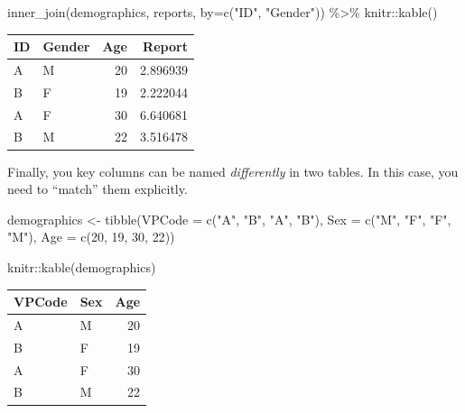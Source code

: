 \documentclass[
]{book}
\newenvironment{Shaded}{\begin{snugshade}}{\end{snugshade}}
\newcommand{\AttributeTok}[1]{\textcolor[rgb]{0.77,0.63,0.00}{#1}}
\newcommand{\DecValTok}[1]{\textcolor[rgb]{0.00,0.00,0.81}{#1}}
\newcommand{\FunctionTok}[1]{\textcolor[rgb]{0.00,0.00,0.00}{#1}}
\newcommand{\NormalTok}[1]{#1}
\newcommand{\OtherTok}[1]{\textcolor[rgb]{0.56,0.35,0.01}{#1}}
\newcommand{\SpecialCharTok}[1]{\textcolor[rgb]{0.00,0.00,0.00}{#1}}
\newcommand{\StringTok}[1]{\textcolor[rgb]{0.31,0.60,0.02}{#1}}
\begin{document}
\begin{Shaded}
\begin{Highlighting}[]
\FunctionTok{inner\_join}\NormalTok{(demographics, reports, }\AttributeTok{by=}\FunctionTok{c}\NormalTok{(}\StringTok{"ID"}\NormalTok{, }\StringTok{"Gender"}\NormalTok{)) }\SpecialCharTok{\%\textgreater{}\%}
\NormalTok{  knitr}\SpecialCharTok{::}\FunctionTok{kable}\NormalTok{()}
\end{Highlighting}
\end{Shaded}

\begin{tabular}{l|l|r|r}
\hline
ID & Gender & Age & Report\\
\hline
A & M & 20 & 2.896939\\
\hline
B & F & 19 & 2.222044\\
\hline
A & F & 30 & 6.640681\\
\hline
B & M & 22 & 3.516478\\
\hline
\end{tabular}

Finally, you key columns can be named \emph{differently} in two tables. In this case, you need to ``match'' them explicitly.

\begin{Shaded}
\begin{Highlighting}[]
\NormalTok{demographics }\OtherTok{\textless{}{-}} \FunctionTok{tibble}\NormalTok{(}\AttributeTok{VPCode =} \FunctionTok{c}\NormalTok{(}\StringTok{"A"}\NormalTok{, }\StringTok{"B"}\NormalTok{, }\StringTok{"A"}\NormalTok{, }\StringTok{"B"}\NormalTok{),}
                       \AttributeTok{Sex =} \FunctionTok{c}\NormalTok{(}\StringTok{"M"}\NormalTok{, }\StringTok{"F"}\NormalTok{, }\StringTok{"F"}\NormalTok{, }\StringTok{"M"}\NormalTok{),}
                       \AttributeTok{Age =} \FunctionTok{c}\NormalTok{(}\DecValTok{20}\NormalTok{, }\DecValTok{19}\NormalTok{, }\DecValTok{30}\NormalTok{, }\DecValTok{22}\NormalTok{))}

\NormalTok{knitr}\SpecialCharTok{::}\FunctionTok{kable}\NormalTok{(demographics)}
\end{Highlighting}
\end{Shaded}

\begin{tabular}{l|l|r}
\hline
VPCode & Sex & Age\\
\hline
A & M & 20\\
\hline
B & F & 19\\
\hline
A & F & 30\\
\hline
B & M & 22\\
\hline
\end{tabular}
\end{document}
